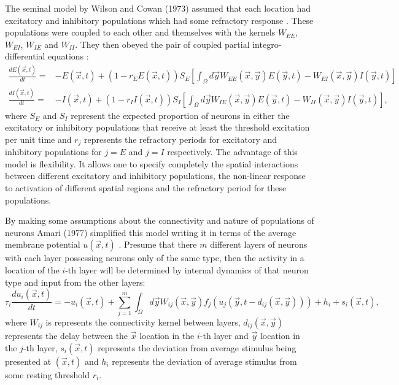 The seminal model by Wilson and Cowan (1973) assumed that each location had excitatory and inhibitory populations which had some refractory response \cite{wilsoncowan2}. These populations were coupled to each other and themselves with the kernels $W_{EE}$, $W_{EI}$, $W_{IE}$ and $W_{II}$. They then obeyed the pair of coupled partial integro-differential equations \cite{wilsoncowan1, wilsoncowan2}:
\begin{align}
\frac{d E(\vec{x},t)}{dt} = & -E(\vec{x},t) + (1- r_E E(\vec{x},t)) S_E \left[ \int_{\Omega} d\vec{y} W_{EE}(\vec{x},\vec{y}) E(\vec{y},t)- W_{EI}(\vec{x},\vec{y}) I(\vec{y},t) \right]\\
\frac{d I(\vec{x},t)}{dt} = & -I(\vec{x},t) + (1- r_I I(\vec{x},t)) S_I \left[ \int_{\Omega} d\vec{y} W_{IE}(\vec{x},\vec{y}) E(\vec{y},t)- W_{II}(\vec{x},\vec{y}) I(\vec{y},t) \right],
\end{align}
where $S_E$ and $S_I$ represent the expected proportion of neurons in either the excitatory or inhibitory populations that receive at least the threshold excitation per unit time and $r_j$ represents the refractory periods for excitatory and inhibitory populations for $j=E$ and $j=I$ respectively. The advantage of this model is flexibility. It allows one to specify completely the spatial interactions between different excitatory and inhibitory populations, the non-linear response to activation of different spatial regions and the refractory period for these populations.

By making some assumptions about the connectivity and nature of populations of neurons Amari (1977) simplified this model writing it in terms of the average membrane potential $u(\vec{x},t)$ \cite{Amari1977-gc}. Presume that there $m$ different layers of neurons with each layer possessing neurons only of the same type, then the activity in a location of the $i$-th layer will be determined by internal dynamics of that neuron type and input from the other layers:
\begin{equation} \label{ch2Amari1}
\tau_i \frac{du_i(\vec{x},t)}{dt} = - u_i(\vec{x},t) + \sum_{j=1}^{m} \int_{\Omega} d\vec{y} W_{ij}(\vec{x},\vec{y}) f_j(u_j(\vec{y},t-d_{ij}(\vec{x},\vec{y}))) + h_i + s_i(\vec{x},t),
\end{equation}
where $W_{ij}$ is represents the connectivity kernel between layers, $d_{ij}(\vec{x},\vec{y})$ represents the delay between the $\vec{x}$ location in the $i$-th layer and $\vec{y}$ location in the $j$-th layer, $s_i(\vec{x},t)$ represents the deviation from average stimulus being presented at $(\vec{x},t)$ and $h_i$ represents the deviation of average stimulus from some resting threshold $r_i$. 

